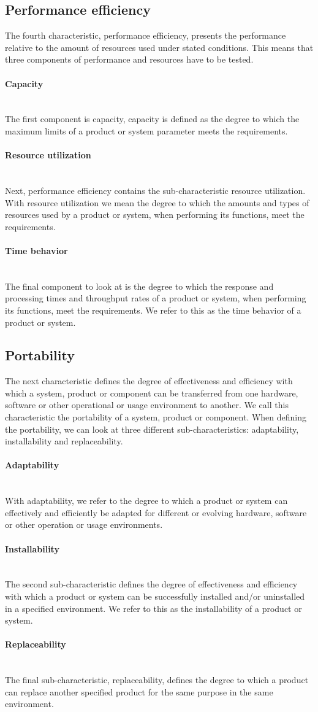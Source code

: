 \documentclass[twoside]{uva-inf-bachelor-thesis}
\newcommand{\myparagraph}[1]{\paragraph{#1}\mbox{}\\}
\begin{document}
\subsection{Performance efficiency}
The fourth characteristic, performance efficiency, presents the performance relative to the amount of resources used under stated conditions. This means that three components of performance and resources have to be tested.

\myparagraph{Capacity}
The first component is capacity, capacity is defined as the degree to which the maximum limits of a product or system parameter meets the requirements.

\myparagraph{Resource utilization}
Next, performance efficiency contains the sub-characteristic resource utilization. With resource utilization we mean the degree to which the amounts and types of resources used by a product or system, when performing its functions, meet the requirements.

\myparagraph{Time behavior}
The final component to look at is the degree to which the response and processing times and throughput rates of a product or system, when performing its functions, meet the requirements. We refer to this as the time behavior of a product or system.

\subsection{Portability}
The next characteristic defines the degree of effectiveness and efficiency with which a system, product or component can be transferred from one hardware, software or other operational or usage environment to another. We call this characteristic the portability of a system, product or component. When defining the portability, we can look at three different sub-characteristics: adaptability, installability and replaceability.

\myparagraph{Adaptability}
With adaptability, we refer to the degree to which a product or system can effectively and efficiently be adapted for different or evolving hardware, software or other operation or usage environments.

\myparagraph{Installability}
The second sub-characteristic defines the degree of effectiveness and efficiency with which a product or system can be successfully installed and/or uninstalled in a specified environment. We refer to this as the installability of a product or system.

\myparagraph{Replaceability}
The final sub-characteristic, replaceability, defines the degree to which a product can replace another specified product for the same purpose in the same environment.
\end{document}
